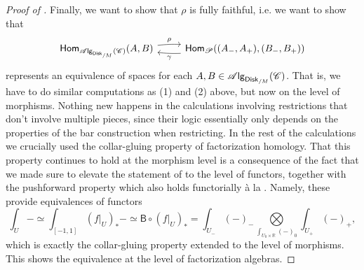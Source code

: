 \documentclass[../text]{subfiles}
\begin{document}
\begin{proof}[Proof of ]
    Finally, we want to show that $\rho$ is fully faithful, i.e. we want to show that
    \begin{equation}
        \begin{tikzcd}
            \mathsf{Hom}_{\alg{\disk[r]_{/M}} (\catC)}(A, B) \arrow[r, bend left=4, "\rho"] & \mathsf{Hom}_{\mathscr{P}}((A_-, A_+), (B_-, B_+)) \arrow[l, bend left=4, "\gamma"]
        \end{tikzcd}
    \end{equation}
    represents an equivalence of spaces for each $A, B \in \alg{\disk[r]_{/M}} (\catC)$. That is, we have to do similar computations as (1) and (2) above, but now on the level of morphisms. Nothing new happens in the calculations involving restrictions that don't involve multiple pieces, since their logic essentially only depends on the properties of the bar construction when restricting. In the rest of the calculations we crucially used the collar-gluing property of factorization homology. That this property continues to hold at the morphism level is a consequence of the fact that we made sure to elevate the statement of  to the level of functors, together with the pushforward property which also holds functorially à la . Namely, these provide equivalences of functors
    \begin{equation}
        \int_U - \simeq \int_{[-1,1]} (f|_U)_* - \simeq \mathsf{B} \circ (f|_U)_* = \int_{U_-} (-)_- \bigotimes\limits_{\int_{U_0 \times \mathbb{R}} (-)_0} \int_{U_+} (-)_+,
    \end{equation}
    which is exactly the collar-gluing property extended to the level of morphisms. This shows the equivalence at the level of factorization algebras.
\end{proof}
\end{document}
